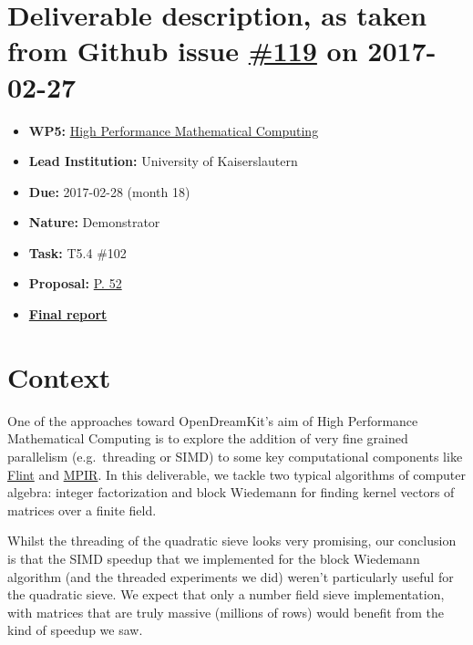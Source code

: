 \section*{\texorpdfstring{Deliverable description, as taken from Github
issue
\href{https://github.com/OpenDreamKit/OpenDreamKit/issues/119}{\#119} on
2017-02-27}{Deliverable description, as taken from Github issue \#119 on 2017-02-27}}\label{deliverable-description-as-taken-from-github-issue-119-on-2017-02-27}

\begin{itemize}
\tightlist
\item
  \textbf{WP5:}
  \href{https://github.com/OpenDreamKit/OpenDreamKit/tree/master/WP5}{High
  Performance Mathematical Computing}
\item
  \textbf{Lead Institution:} University of Kaiserslautern
\item
  \textbf{Due:} 2017-02-28 (month 18)
\item
  \textbf{Nature:} Demonstrator
\item
  \textbf{Task:} T5.4 \#102
\item
  \textbf{Proposal:}
  \href{https://github.com/OpenDreamKit/OpenDreamKit/raw/master/Proposal/proposal-www.pdf}{P.
  52}
\item
  \textbf{\href{https://github.com/OpenDreamKit/OpenDreamKit/raw/master/WP5/D5.6/report-final.pdf}{Final
  report}}
\end{itemize}

\section*{Context}\label{context}

One of the approaches toward OpenDreamKit's aim of High Performance
Mathematical Computing is to explore the addition of very fine grained
parallelism (e.g.~threading or SIMD) to some key computational
components like \href{http://flintlib.org}{Flint} and
\href{http://mpir.org/}{MPIR}. In this deliverable, we tackle two
typical algorithms of computer algebra: integer factorization and block
Wiedemann for finding kernel vectors of matrices over a finite field.

Whilst the threading of the quadratic sieve looks very promising, our
conclusion is that the SIMD speedup that we implemented for the block
Wiedemann algorithm (and the threaded experiments we did) weren't
particularly useful for the quadratic sieve. We expect that only a
number field sieve implementation, with matrices that are truly massive
(millions of rows) would benefit from the kind of speedup we saw.

